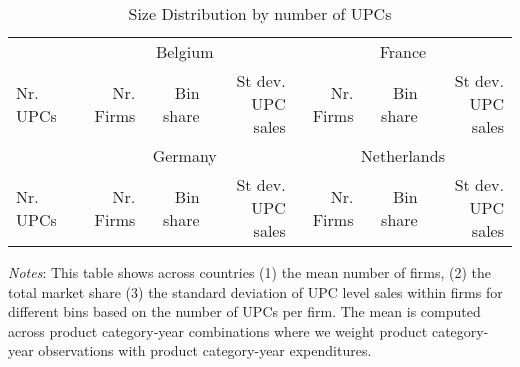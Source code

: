 \begin{table}[H]
	\centering		
	\caption{Size Distribution by number of UPCs}
    \label{tab: app_bars_firms_size_nupcs}
	\begin{spacing}{1.1}
        \begin{tabular}{lrrrrrr} \toprule
            & \multicolumn{3}{c}{Belgium} & \multicolumn{3}{c}{France} \\ 
                \cmidrule(lr){2-4} \cmidrule(lr){5-7} 
            Nr. UPCs &  Nr. Firms & Bin share & St dev. UPC sales &
                        Nr. Firms & Bin share & St dev. UPC sales\\ \midrule
		    
            & \multicolumn{3}{c}{Germany} & \multicolumn{3}{c}{Netherlands} \\ 
                \cmidrule(lr){2-4} \cmidrule(lr){5-7} 
                Nr. UPCs &  Nr. Firms & Bin share & St dev. UPC sales &
                Nr. Firms & Bin share & St dev. UPC sales\\ \midrule
           
	    \end{tabular}
    \end{spacing}
    \parbox{\textwidth}{
        \begin{spacing}{1} 
            {\footnotesize 
            \textit{Notes}: This table shows across countries (1) the mean number of firms, (2) the total market share (3) the standard deviation of UPC level sales within firms for different bins based on the number of UPCs per firm. The mean is computed across product category-year combinations where we weight product category-year observations with product category-year expenditures. }
        \end{spacing}}
\end{table}


